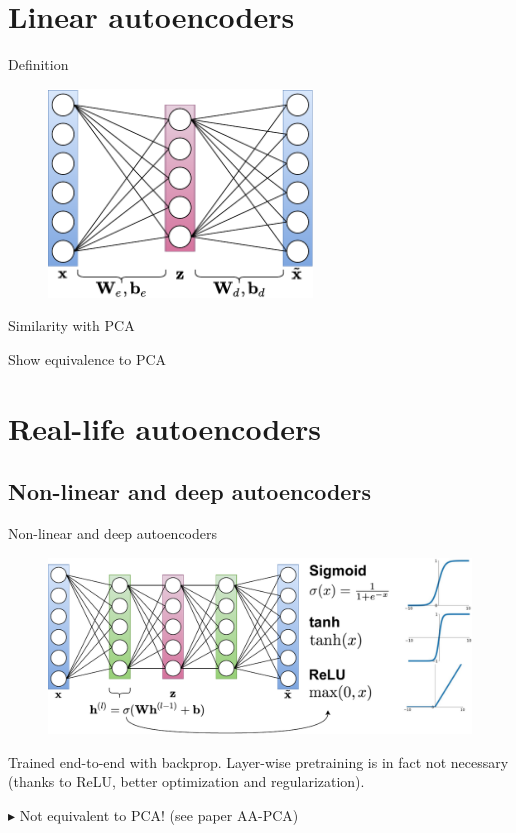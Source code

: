 \documentclass{beamer}
\begin{document}
  \section{Linear autoencoders}

  \begin{frame}{Definition}

    \begin{figure}
      \includegraphics[width=7cm]{rc/linear-autoencoder}
    \end{figure}
    
  \end{frame}

  \begin{frame}{Similarity with PCA}

    Show equivalence to PCA

    \cite{Plaut2018}
    
  \end{frame}

  \section{Real-life autoencoders}

  \subsection{Non-linear and deep autoencoders}

  \begin{frame}{Non-linear and deep autoencoders}

    \begin{figure}
      \includegraphics[width=\textwidth]{rc/deep-autoencoder}
    \end{figure}

    Trained end-to-end with backprop. Layer-wise pretraining \cite{Hinton2006} is in fact not necessary \small{(thanks to ReLU, better optimization and regularization)}.

    $\blacktriangleright$ Not equivalent to PCA! (see paper AA-PCA)

  \end{frame}
\end{document}
